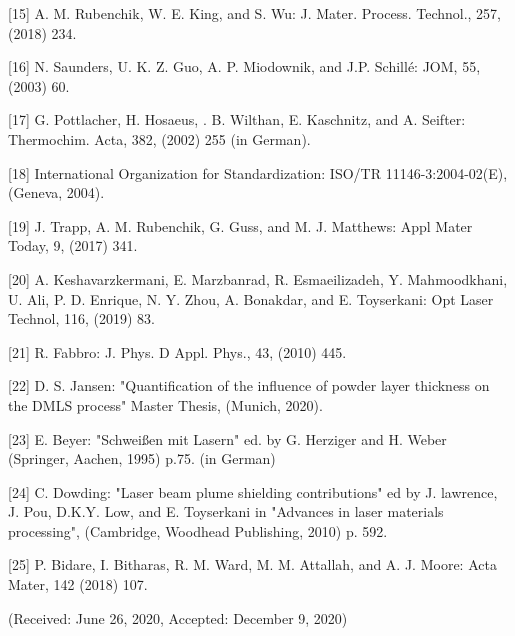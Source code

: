 \documentclass[10pt]{article}
\begin{document}
[15] A. M. Rubenchik, W. E. King, and S. Wu: J. Mater. Process. Technol., 257, (2018) 234.

[16] N. Saunders, U. K. Z. Guo, A. P. Miodownik, and J.P. Schillé: JOM, 55, (2003) 60.

[17] G. Pottlacher, H. Hosaeus, . B. Wilthan, E. Kaschnitz, and A. Seifter: Thermochim. Acta, 382, (2002) 255 (in German).

[18] International Organization for Standardization: ISO/TR 11146-3:2004-02(E), (Geneva, 2004).

[19] J. Trapp, A. M. Rubenchik, G. Guss, and M. J. Matthews: Appl Mater Today, 9, (2017) 341.

[20] A. Keshavarzkermani, E. Marzbanrad, R. Esmaeilizadeh, Y. Mahmoodkhani, U. Ali, P. D. Enrique, N. Y. Zhou, A. Bonakdar, and E. Toyserkani: Opt Laser Technol, 116, (2019) 83.

[21] R. Fabbro: J. Phys. D Appl. Phys., 43, (2010) 445.

[22] D. S. Jansen: "Quantification of the influence of powder layer thickness on the DMLS process" Master Thesis, (Munich, 2020).

[23] E. Beyer: "Schweißen mit Lasern" ed. by G. Herziger and H. Weber (Springer, Aachen, 1995) p.75. (in German)

[24] C. Dowding: "Laser beam plume shielding contributions" ed by J. lawrence, J. Pou, D.K.Y. Low, and E. Toyserkani in "Advances in laser materials processing", (Cambridge, Woodhead Publishing, 2010) p. 592.

[25] P. Bidare, I. Bitharas, R. M. Ward, M. M. Attallah, and A. J. Moore: Acta Mater, 142 (2018) 107.

(Received: June 26, 2020, Accepted: December 9, 2020)
\end{document}
